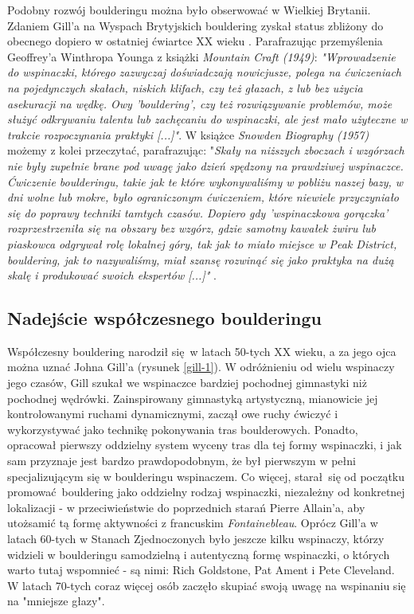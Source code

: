 \documentclass{article}
\begin{document}
Podobny rozwój boulderingu można było obserwować w Wielkiej Brytanii. Zdaniem Gill'a na Wyspach Brytyjskich bouldering zyskał status zbliżony do obecnego dopiero w ostatniej ćwiartce XX wieku \cite{gill-history-1.2}. Parafrazując przemyślenia Geoffrey'a Winthropa Younga z książki \textit{Mountain Craft (1949)}: \textit{"Wprowadzenie do wspinaczki, którego zazwyczaj doświadczają nowicjusze, polega na ćwiczeniach na pojedynczych skałach, niskich klifach, czy też głazach, z lub bez użycia asekuracji na wędkę. Owy 'bouldering', czy też rozwiązywanie problemów, może służyć odkrywaniu talentu lub zachęcaniu do wspinaczki, ale jest mało użyteczne w trakcie rozpoczynania praktyki [...]"}. W książce \textit{Snowden Biography (1957)} możemy z kolei przeczytać, parafrazując: "\textit{Skały na niższych zboczach i wzgórzach nie były zupełnie brane pod uwagę jako dzień spędzony na prawdziwej wspinaczce. Ćwiczenie boulderingu, takie jak te które wykonywaliśmy w pobliżu naszej bazy, w dni wolne lub mokre, było ograniczonym ćwiczeniem, które niewiele przyczyniało się do poprawy techniki tamtych czasów. Dopiero gdy 'wspinaczkowa gorączka' rozprzestrzeniła się na obszary bez wzgórz, gdzie samotny kawałek żwiru lub piaskowca odgrywał rolę lokalnej góry, tak jak to miało miejsce w Peak District, bouldering, jak to nazywaliśmy, miał szansę rozwinąć się jako praktyka na dużą skalę i produkować swoich ekspertów [...]"} \cite{gill-history-1.2}.

\subsection{Nadejście współczesnego boulderingu}
Współczesny bouldering narodził się w latach 50-tych XX wieku, a za jego ojca można uznać Johna Gill'a (rysunek \ref{gill-1}). W odróżnieniu od wielu wspinaczy jego czasów, Gill szukał we wspinaczce bardziej pochodnej gimnastyki niż pochodnej wędrówki. Zainspirowany gimnastyką artystyczną, mianowicie jej kontrolowanymi ruchami dynamicznymi, zaczął owe ruchy ćwiczyć i wykorzystywać jako technikę pokonywania tras boulderowych. Ponadto, opracował pierwszy oddzielny system wyceny tras dla tej formy wspinaczki, i jak sam przyznaje jest bardzo prawdopodobnym, że był pierwszym w pełni specjalizującym się w boulderingu wspinaczem. Co więcej, starał się od początku promować bouldering jako oddzielny rodzaj wspinaczki, niezależny od konkretnej lokalizacji - w przeciwieństwie do poprzednich starań Pierre Allain'a, aby utożsamić tą formę aktywności z francuskim \textit{Fontainebleau}. Oprócz Gill'a w latach 60-tych w Stanach Zjednoczonych było jeszcze kilku wspinaczy, którzy widzieli w boulderingu samodzielną i autentyczną formę wspinaczki, o których warto tutaj wspomnieć - są nimi: Rich Goldstone, Pat Ament i Pete Cleveland. W latach 70-tych coraz więcej osób zaczęło skupiać swoją uwagę na wspinaniu się na "mniejsze głazy".
\end{document}
